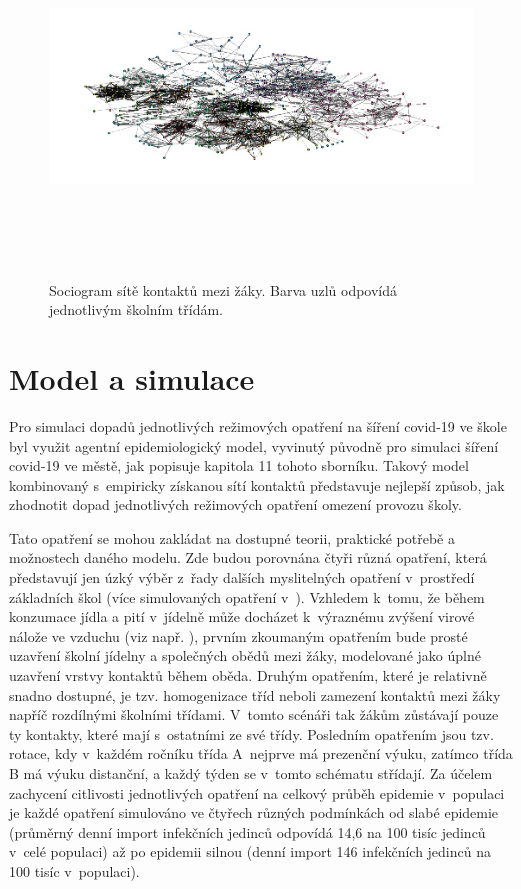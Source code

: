 \begin{figure}[ht]
    \centering
    \includegraphics[width=340pt, height=270pt]{./pic/students_all_classes2.jpg}
    \caption{Sociogram sítě kontaktů mezi žáky. Barva uzlů odpovídá jednotlivým školním třídám.}
    \label{fig:100-teachers}
\end{figure}

\section*{Model a simulace}
Pro simulaci dopadů jednotlivých režimových opatření na šíření covid-19 ve škole byl využit agentní epidemiologický model, vyvinutý původně pro simulaci šíření covid-19 ve městě, jak popisuje kapitola 11 tohoto sborníku. Takový model kombinovaný s~empiricky získanou sítí kontaktů představuje nejlepší způsob, jak zhodnotit dopad jednotlivých režimových opatření omezení provozu školy. 

Tato opatření se mohou zakládat na dostupné teorii, praktické potřebě a mož\-nos\-tech daného modelu. Zde budou porovnána čtyři různá opatření, která představují jen úzký výběr z~řady dalších myslitelných opatření v~prostředí základních škol (více simulovaných opatření v~\cite{Brom2021.06.28.21259628}). Vzhledem k~tomu, že během konzumace jídla a pití v~jídelně může docházet k~výraznému zvýšení virové nálože ve vzduchu (viz např. \cite{Chen_etal2020, eichler2021transmission}), prvním zkoumaným opatřením bude prosté uzavření školní jídelny a společných obědů mezi žáky, modelované jako úplné uzavření vrstvy kontaktů během oběda. Druhým opatřením, které je relativně snadno dostupné, je tzv. homogenizace tříd neboli zamezení kontaktů mezi žáky napříč rozdílnými školními třídami. V~tomto scénáři tak žákům zůstávají pouze ty kontakty, které mají s~ostatními ze své třídy. Posledním opatřením jsou tzv. rotace, kdy v~každém ročníku třída A~nejprve má prezenční výuku, zatímco třída B má výuku distanční, a každý týden se v~tomto schématu střídají. Za účelem zachycení citlivosti jednotlivých opatření na celkový průběh epidemie v~populaci je každé opatření simulováno ve čtyřech různých podmínkách od slabé epidemie (průměrný denní import infekčních jedinců odpovídá 14,6 na 100 tisíc jedinců v~celé populaci) až po epidemii silnou (denní import 146 infekčních jedinců na 100 tisíc v~populaci).

